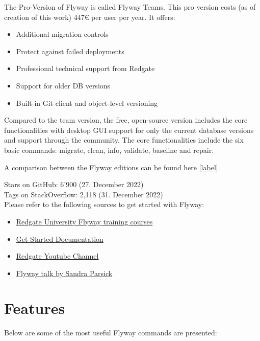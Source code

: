 %
The Pro-Version of Flyway is called Flyway Teams. This pro version costs (as of creation of this work) 447€ per user per year. It offers:
\begin{itemize}
	\item Additional migration controls
	\item Protect against failed deployments
	\item Professional technical support from Redgate
	\item Support for older DB versions
	\item Built-in Git client and object-level versioning
\end{itemize}

Compared to the team version, the free, open-source version includes the core functionalities with desktop \gls{GUI} support for only the current database versions and support through the community. The core functionalities include the six basic commands: migrate, clean, info, validate, baseline and repair.

A comparison between the Flyway editions can be found here \autoref{label}.\\

%
Stars on GitHub: 6'900 (27. December 2022)\\
Tags on StackOverflow: 2,118 (31. December 2022)\\

%
Please refer to the following sources to get started with Flyway:
\begin{itemize}
	\item \href{https://www.red-gate.com/hub/university/courses/flyway}{Redgate University Flyway training courses}
	\item \href{https://flywaydb.org/documentation}{Get Started Documentation}
	\item \href{https://www.youtube.com/playlist?list=PLhFdCK734P8DYHYYWaJpzJJ-qZFZ_JTHM}{Redgate Youtube Channel}
	\item \href{https://www.youtube.com/watch?v=dzRzlDpdDW4}{Flyway talk by Sandra Parsick}
\end{itemize}

\section{Features \label{flyway_features}}
Below are some of the most useful Flyway commands are presented:


